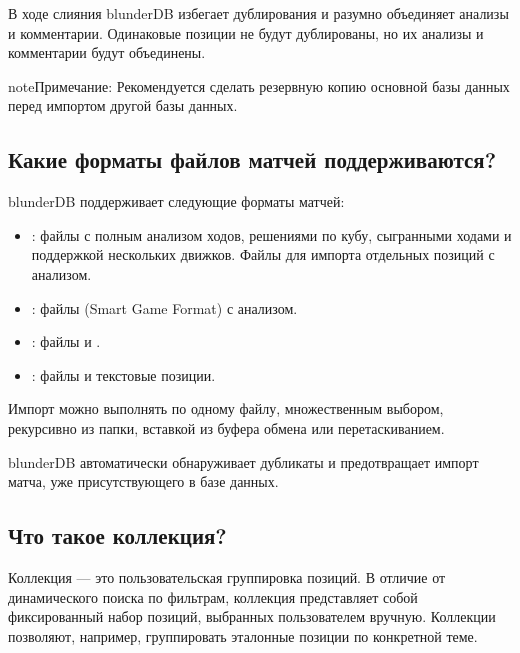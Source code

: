 \documentclass[letterpaper,10pt,russian]{sphinxmanual}
\begin{document}
\sphinxAtStartPar
В ходе слияния blunderDB избегает дублирования и разумно объединяет анализы и комментарии. Одинаковые позиции не будут дублированы, но их анализы и комментарии будут объединены.

\begin{sphinxadmonition}{note}{Примечание:}
\sphinxAtStartPar
Рекомендуется сделать резервную копию основной базы данных перед импортом другой базы данных.
\end{sphinxadmonition}


\subsection{Какие форматы файлов матчей поддерживаются?}
\label{\detokenize{faq:quels-formats-de-fichiers-de-match-sont-supportes}}
\sphinxAtStartPar
blunderDB поддерживает следующие форматы матчей:
\begin{itemize}
\item {} 
\sphinxAtStartPar
{}: файлы  с полным анализом ходов, решениями по кубу, сыгранными ходами и поддержкой нескольких движков. Файлы  для импорта отдельных позиций с анализом.

\item {} 
\sphinxAtStartPar
{}: файлы  (Smart Game Format) с анализом.

\item {} 
\sphinxAtStartPar
{}: файлы  и .

\item {} 
\sphinxAtStartPar
{}: файлы  и текстовые позиции.

\end{itemize}

\sphinxAtStartPar
Импорт можно выполнять по одному файлу, множественным выбором, рекурсивно из папки, вставкой из буфера обмена или перетаскиванием.

\sphinxAtStartPar
blunderDB автоматически обнаруживает дубликаты и предотвращает импорт матча, уже присутствующего в базе данных.


\subsection{Что такое коллекция?}
\label{\detokenize{faq:qu-est-ce-qu-une-collection}}
\sphinxAtStartPar
Коллекция — это пользовательская группировка позиций. В отличие от динамического поиска по фильтрам, коллекция представляет собой фиксированный набор позиций, выбранных пользователем вручную. Коллекции позволяют, например, группировать эталонные позиции по конкретной теме.
\end{document}
